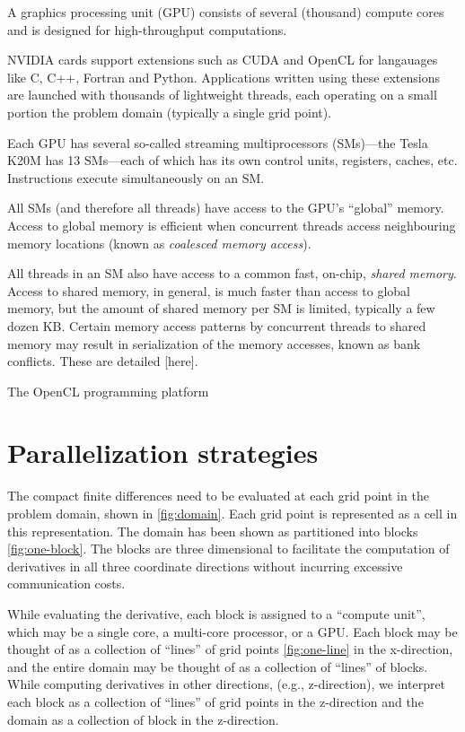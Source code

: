 \documentclass{article}
\begin{document}
    A graphics processing unit (GPU) consists of several (thousand)
    compute cores and is designed for high-throughput computations.
    
    NVIDIA cards support extensions such as CUDA and OpenCL for
    langauages like C, C++, Fortran and Python.
    Applications written using these extensions are launched
    with thousands of lightweight threads,
    each operating on a small portion the problem domain (typically a single grid point).
    
    Each GPU has several so-called streaming multiprocessors (SMs)---the Tesla K20M
    has 13 SMs---each of which has its own control units, registers, caches, etc.
    Instructions execute simultaneously on an SM.
    
    All SMs (and therefore all threads) have access to the GPU's ``global'' memory.
    Access to global memory is efficient when concurrent threads access neighbouring memory locations
    (known as \emph{coalesced memory access}).

    All threads in an SM also have access to a common fast, on-chip, \emph{shared memory}.
    Access to shared memory, in general, is much faster than access to global memory,
    but the amount of shared memory per SM is limited, typically a few dozen KB.
    Certain memory access patterns by concurrent threads to shared memory may result in
    serialization of the memory accesses, known as bank conflicts. These are detailed [here].

    The OpenCL programming platform



\section{Parallelization strategies}

    The compact finite differences need to be evaluated
    at each grid point in the problem domain,
    shown in \ref{fig:domain}.
    Each grid point is represented as a cell in this representation.
    The domain has been shown as partitioned into blocks \ref{fig:one-block}.
    The blocks are three dimensional to facilitate
    the computation of derivatives in all three coordinate directions
    without incurring excessive communication costs.

    While evaluating the derivative, each block is assigned to a ``compute unit'',
    which may be a single core, a multi-core processor, or a GPU.
    Each block may be thought of as a collection of ``lines'' of grid points
    \ref{fig:one-line} in the x-direction,
    and the entire domain may be thought of as a collection of ``lines'' of
    blocks.
    While computing derivatives in other directions,
    (e.g., z-direction), we interpret each block as a collection of ``lines''
    of grid points in the z-direction and the domain as a collection of
    block in the z-direction.
\end{document}

